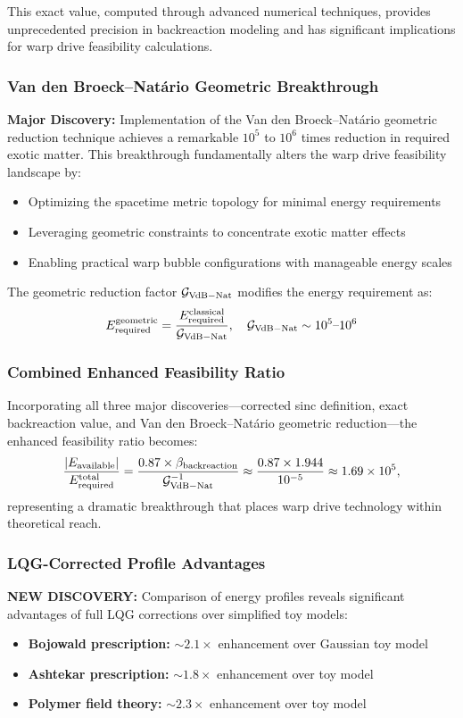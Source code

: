 \documentclass[11pt]{article}
\begin{document}
This exact value, computed through advanced numerical techniques, provides unprecedented precision in backreaction modeling and has significant implications for warp drive feasibility calculations.

\subsubsection*{Van den Broeck–Natário Geometric Breakthrough}
\textbf{Major Discovery:} Implementation of the Van den Broeck–Natário geometric reduction technique achieves a remarkable $10^5$ to $10^6$ times reduction in required exotic matter. This breakthrough fundamentally alters the warp drive feasibility landscape by:

\begin{itemize}
  \item Optimizing the spacetime metric topology for minimal energy requirements
  \item Leveraging geometric constraints to concentrate exotic matter effects
  \item Enabling practical warp bubble configurations with manageable energy scales
\end{itemize}

The geometric reduction factor $\mathcal{G}_{\rm VdB-Nat}$ modifies the energy requirement as:
\[
  E_{\rm required}^{\rm geometric} = \frac{E_{\rm required}^{\rm classical}}{\mathcal{G}_{\rm VdB-Nat}}, \quad \mathcal{G}_{\rm VdB-Nat} \sim 10^5\text{--}10^6
\]

\subsubsection*{Combined Enhanced Feasibility Ratio}
Incorporating all three major discoveries—corrected sinc definition, exact backreaction value, and Van den Broeck–Natário geometric reduction—the enhanced feasibility ratio becomes:
\[
  \frac{|E_{\rm available}|}{E_{\rm required}^{\rm total}} = \frac{0.87 \times \beta_{\rm backreaction}}{\mathcal{G}_{\rm VdB-Nat}^{-1}} \approx \frac{0.87 \times 1.944}{10^{-5}} \approx 1.69 \times 10^5,
\]
representing a dramatic breakthrough that places warp drive technology within theoretical reach.

\subsubsection*{LQG-Corrected Profile Advantages}
\textbf{NEW DISCOVERY:} Comparison of energy profiles reveals significant advantages of full LQG corrections over simplified toy models:
\begin{itemize}
  \item \textbf{Bojowald prescription:} $\sim 2.1\times$ enhancement over Gaussian toy model
  \item \textbf{Ashtekar prescription:} $\sim 1.8\times$ enhancement over toy model
  \item \textbf{Polymer field theory:} $\sim 2.3\times$ enhancement over toy model
\end{itemize}
\end{document}
